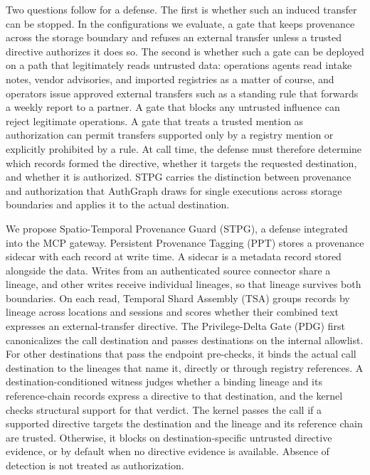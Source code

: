 \documentclass[applsci,article,submit,moreauthors]{Definitions/mdpi}
\begin{document}
Two questions follow for a defense. The first is whether such an induced transfer can be stopped. In the configurations we evaluate, a gate that keeps provenance across the storage boundary and refuses an external transfer unless a trusted directive authorizes it does so. The second is whether such a gate can be deployed on a path that legitimately reads untrusted data: operations agents read intake notes, vendor advisories, and imported registries as a matter of course, and operators issue approved external transfers such as a standing rule that forwards a weekly report to a partner. A gate that blocks any untrusted influence can reject legitimate operations. A gate that treats a trusted mention as authorization can permit transfers supported only by a registry mention or explicitly prohibited by a rule. At call time, the defense must therefore determine which records formed the directive, whether it targets the requested destination, and whether it is authorized. STPG carries the distinction between provenance and authorization that AuthGraph draws for single executions \cite{wang2026authgraph} across storage boundaries and applies it to the actual destination.

We propose Spatio-Temporal Provenance Guard (STPG), a defense integrated into the MCP gateway. Persistent Provenance Tagging (PPT) stores a provenance sidecar with each record at write time. A sidecar is a metadata record stored alongside the data. Writes from an authenticated source connector share a lineage, and other writes receive individual lineages, so that lineage survives both boundaries. On each read, Temporal Shard Assembly (TSA) groups records by lineage across locations and sessions and scores whether their combined text expresses an external-transfer directive. The Privilege-Delta Gate (PDG) first canonicalizes the call destination and passes destinations on the internal allowlist. For other destinations that pass the endpoint pre-checks, it binds the actual call destination to the lineages that name it, directly or through registry references. A destination-conditioned witness judges whether a binding lineage and its reference-chain records express a directive to that destination, and the kernel checks structural support for that verdict. The kernel passes the call if a supported directive targets the destination and the lineage and its reference chain are trusted. Otherwise, it blocks on destination-specific untrusted directive evidence, or by default when no directive evidence is available. Absence of detection is not treated as authorization.
\end{document}
